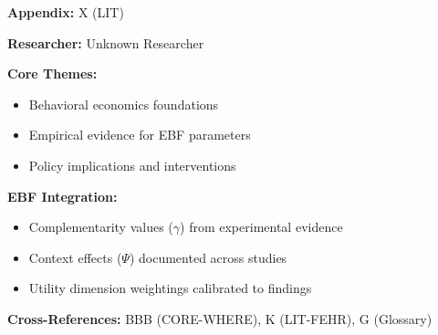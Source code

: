 \begin{tcolorbox}[colback=blue!5!white, colframe=blue!75!black,
    title=Quick Reference: Unknown Researcher Research]

\textbf{Appendix:} X (LIT)

\textbf{Researcher:} Unknown Researcher

\textbf{Core Themes:}
\begin{itemize}[nosep]
\item Behavioral economics foundations
\item Empirical evidence for EBF parameters
\item Policy implications and interventions
\end{itemize}

\textbf{EBF Integration:}
\begin{itemize}[nosep]
\item Complementarity values ($\gamma$) from experimental evidence
\item Context effects ($\Psi$) documented across studies
\item Utility dimension weightings calibrated to findings
\end{itemize}

\textbf{Cross-References:} BBB (CORE-WHERE), K (LIT-FEHR), G (Glossary)
\end{tcolorbox}


